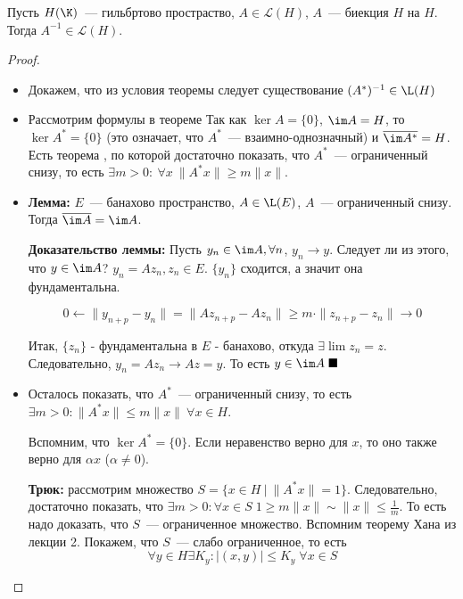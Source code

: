 \begin{theorem}\label{8.4}
     Пусть $H(\K)$~--- гильбртово простраство, $A \in \mathcal{L}(H)$,
     $A$~--- биекция $H$ на $H$. Тогда $A^{-1} \in \mathcal{L}(H)$.
\end{theorem}

\begin{proof}  %
    \begin{itemize}
        \item[0.] Докажем, что из условия теоремы следует существование $(A^*)^{-1} \in \L(H)$  %
        \item[1.] Рассмотрим формулы в теореме 
        Так как $\ker A = \{0\}$, $\im A = H$, то
        $\ker A^* = \{0\}$ (это означает, что
        $A^*$~--- взаимно-однозначный) и $\overline{\im A^*} = H$.
        Есть теорема , по которой достаточно показать, что
        $A^*$~--- ограниченный снизу, то есть 
        $\exists m > 0:\ \forall x \ \|A^* x\| \geqslant m \|x\|$.
        \item[2.] \textbf{Лемма:} $E$~--- банахово пространство,
        $A \in \L(E)$, $A$~--- ограниченный снизу. 
        Тогда $\overline{\im A} = \im A$.
        
        \textbf{Доказательство леммы:} Пусть $y_n \in \im A, \forall n$, $y_n \to y$. Следует ли из этого, что $y \in \im A$?
        $y_n = A z_n, z_n \in E$. $\{y_n\}$ сходится, а значит она фундаментальна.
    
        \[ 0 \leftarrow \|y_{n+p}-y_n\|=\|Az_{n+p}-Az_n\| \geq m \cdot \|z_{n+p} - z_n \| \to 0 \] 

        Итак, $\{z_n\}$ - фундаментальна в $E$ - банахово, откуда $\exists \lim z_n = z$. Следовательно, $y_n = A z_n \to A z = y$. То есть $y \in \im A \; \blacksquare$
        \item[3.] Осталось показать, что $A^*$~--- ограниченный снизу, то есть $\exists m > 0 : \|A^* x\| \leqslant m \|x\| \ \forall x \in H$.

        Вспомним, что $\ker A^* = \{0\}$. Если неравенство верно для $x$, то оно также верно для $\alpha x$ ($\alpha \neq 0$).

        \textbf{Трюк:} рассмотрим множество 
        $S = \{x \in H \: | \: \|A^*x\| = 1\}$. Следовательно, достаточно показать, что $\exists m > 0 : \forall x \in S \; 1 \geqslant m \|x\| \sim \|x\| \leqslant \frac{1}{m}$. То есть надо доказать, что $S$~--- ограниченное множество.
        Вспомним теорему Хана из лекции 2.
        Покажем, что $S$~--- слабо ограниченное, то есть
        \[
        \forall y \in H \exists K_y : |(x, y)| \leqslant K_y \; \forall x \in S
        \]


\end{itemize}
\end{proof}

